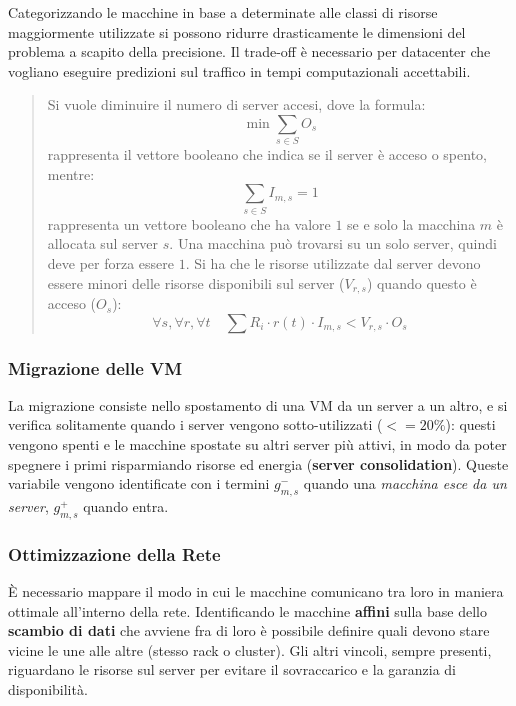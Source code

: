 \documentclass{article}
\begin{document}
		Categorizzando le macchine in base a determinate alle classi di risorse maggiormente utilizzate si possono ridurre drasticamente le dimensioni del problema a scapito della precisione. Il trade-off è necessario per datacenter che vogliano eseguire predizioni sul traffico in tempi computazionali accettabili.
		
		\begin{quote}
		Si vuole diminuire il numero di server accesi, dove la formula: \[
		\min{\sum_{s\in S}} O_s
		\] rappresenta il vettore booleano che indica se il server è
		acceso o spento, mentre: \[
		\sum_{s \in S}I_{m,s} = 1
		\] rappresenta un vettore booleano che ha valore \(1\) se
		e solo la macchina \(m\) è allocata sul server \(s\). Una
		macchina può trovarsi su un solo server, quindi deve per forza essere
		\(1\). Si ha che le risorse utilizzate dal server devono essere minori
		delle risorse disponibili sul server (\(V_{r,s}\)) quando questo è
		acceso (\(O_s\)): \[
		\forall s, \forall r, \forall t \quad \sum R_i \cdot r(t) \cdot I_{m,s} < V_{r,s} \cdot O_s
		\]
		\end{quote}

		\subsubsection{Migrazione delle VM}\label{migrazione-delle-vm}
		
		La migrazione consiste nello spostamento di una VM da un server a un altro, e si verifica solitamente quando i server vengono sotto-utilizzati ($<=20\%$): questi vengono spenti e le macchine spostate su altri server più attivi, in modo da poter spegnere i primi risparmiando risorse ed energia (\textbf{server consolidation}). Queste variabile vengono identificate con i termini \(g_{m,s}^{-}\) quando una \emph{macchina esce da un server}, \(g_{m,s}^{+}\) quando entra.
		
		\subsubsection{Ottimizzazione della Rete}\label{ottimizzazione-della-rete}
		
		È necessario mappare il modo in cui le macchine comunicano tra loro in	maniera ottimale all'interno della rete. Identificando le macchine \textbf{affini} sulla base dello \textbf{scambio di dati} che avviene fra di loro è possibile definire quali devono stare vicine le une alle altre (stesso rack o cluster). Gli altri vincoli, sempre presenti, riguardano le risorse sul server per evitare il sovraccarico e la garanzia di disponibilità.\\
		
\end{document}
